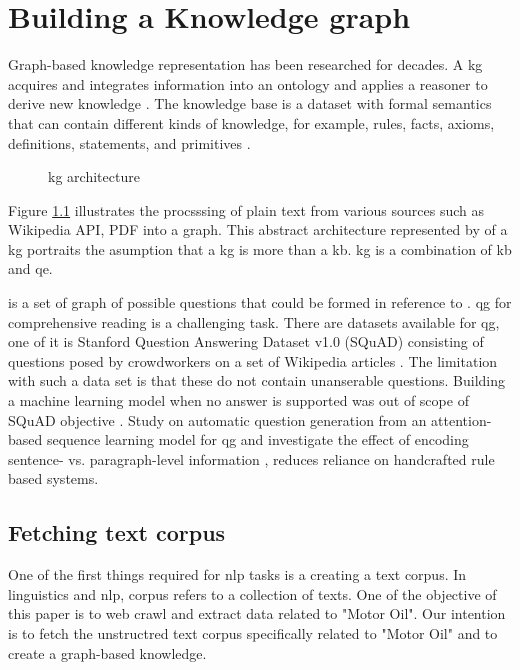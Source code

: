 \chapter{Building a Knowledge graph}

Graph-based knowledge representation has been researched for decades.
A \acf{kg} acquires and integrates information into an ontology and applies a reasoner to derive new knowledge \parencite{LisaEhrlinger}.
The knowledge base is a dataset with formal semantics that can contain different kinds of knowledge, for example, rules, facts, axioms, definitions, statements, and primitives \parencite{Davies.2008cop.2006}.

\begin{figure}[h!]
    \centering
    
    \caption{\acl{kg} architecture}
    \label{fig:kg}
    \parencite[Chapter 4]{LisaEhrlinger}
\end{figure}

Figure \ref{fig:kg} illustrates the procsssing of plain text from various sources such as  Wikipedia API, PDF into a graph. This abstract architecture represented by  of a \acl{kg} portraits the asumption that a \acl{kg} is more than a \acf{kb}. \acl{kg} is a combination of \acl{kb} and \acf{qe}. 

 is a set of graph of possible questions that could be formed in reference to . \acf{qg} for comprehensive reading is a challenging task. There are datasets available for  \acs{qg}, one of it is Stanford Question Answering Dataset v1.0 (SQuAD) consisting of questions posed by crowdworkers on a set of Wikipedia articles \parencite{PranavRajpurkar.}. The limitation with such a data set is that these do not contain unanserable questions. Building a machine learning model when no answer is supported was out of scope of SQuAD objective \parencite{LupeHernandez}.  Study on automatic question generation from an attention-based sequence learning model for  \ac{qg} and investigate the effect of encoding sentence- vs. paragraph-level information \parencite{DuXinya.29042017}, reduces reliance on handcrafted rule based systems.

\clearpage

\section{Fetching text corpus}


One of the first things required for \acf*{nlp} tasks is a creating a text corpus.
In linguistics and \acs{nlp}, corpus refers to a collection of texts. One of the objective of this paper is to web crawl and extract data related to "Motor Oil". Our intention is to fetch the unstructred text corpus specifically related to "Motor Oil" and to create a graph-based knowledge. 

